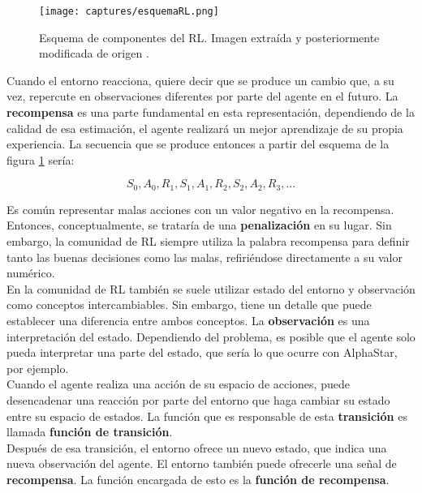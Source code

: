 \documentclass[11pt,fleqn]{book} %
\begin{document}
\begin{figure}[H]
	\centering\texttt{[image: captures/esquemaRL.png]}
	\caption{Esquema de componentes del RL. Imagen extraída y posteriormente modificada de origen \cite{article:RLwikipedia}.}
	\label{fig:esquemaRL} %
\end{figure}

Cuando el entorno reacciona, quiere decir que se produce un cambio que, a su vez, repercute en observaciones diferentes por parte del agente en el futuro. La \textbf{recompensa} es una parte fundamental en esta representación, dependiendo de la calidad de esa estimación, el agente realizará un mejor aprendizaje de su propia experiencia. La secuencia que se produce entonces a partir del esquema de la figura \ref{fig:esquemaRL} sería:

\begin{equation*}
S_0, A_0, R_1, S_1, A_1, R_2, S_2, A_2, R_3, ...
\end{equation*}

Es común representar malas acciones con un valor negativo en la recompensa. Entonces, conceptualmente, se trataría de una \textbf{penalización} en su lugar. Sin embargo, la comunidad de RL siempre utiliza la palabra recompensa para definir tanto las buenas decisiones como las malas, refiriéndose directamente a su valor numérico. \\

En la comunidad de RL también se suele utilizar estado del entorno y observación como conceptos intercambiables. Sin embargo, tiene un detalle que puede establecer una diferencia entre ambos conceptos. La \textbf{observación} es una interpretación del estado. Dependiendo del problema, es posible que el agente solo pueda interpretar una parte del estado, que sería lo que ocurre con AlphaStar, por ejemplo. \\

Cuando el agente realiza una acción de su espacio de acciones, puede desencadenar una reacción por parte del entorno que haga cambiar su estado entre su espacio de estados. La función que es responsable de esta \textbf{transición} es llamada \textbf{función de transición}. \\

Después de esa transición, el entorno ofrece un nuevo estado, que indica una nueva observación del agente. El entorno también puede ofrecerle una señal de \textbf{recompensa}. La función encargada de esto es la \textbf{función de recompensa}. \\
\end{document}

